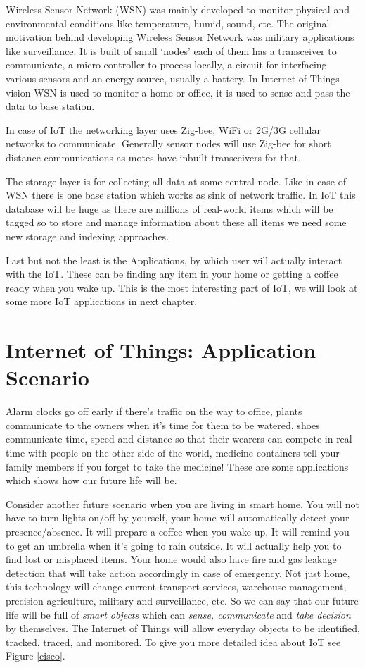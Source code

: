 \documentclass [a4paper,12pt]{book}
\begin{document}
Wireless Sensor Network (WSN) was mainly developed to monitor physical and environmental conditions like temperature, humid, sound, etc. The original motivation behind developing Wireless Sensor Network was military applications like surveillance. It is built of small `nodes' each of them has a transceiver to communicate, a micro controller to process locally, a circuit for interfacing various sensors and an energy source, usually a battery. In Internet of Things vision WSN is used to monitor a home or office, it is used to sense and pass the data to base station.

In case of IoT the networking layer uses Zig-bee, WiFi or 2G/3G cellular networks to communicate. Generally sensor nodes will use Zig-bee for short distance communications as motes have inbuilt transceivers for that.

The storage layer is for collecting all data at some central node. Like in case of WSN there is one base station which works as sink of network traffic. In IoT this database will be huge as there are millions of real-world items which will be tagged so to store and manage information about these all items we need some new storage and indexing approaches.

Last but not the least is the Applications, by which user will actually interact with the IoT. These can be finding any item in your home or getting a coffee ready when you wake up. This is the most interesting part of IoT, we will look at some more IoT applications in next chapter.

\section{Internet of Things: Application Scenario}

Alarm clocks go off early if there’s traffic on the way to office, plants communicate to the owners when it’s time for them to be watered, shoes communicate time, speed and distance so that their wearers can compete in real time with people on the other side of the world, medicine containers tell your family members if you forget to take the medicine! These are some applications which shows how our future life will be.

Consider another future scenario when you are living in smart home. You will not have to turn lights on/off by yourself, your home will automatically detect your presence/absence. It will prepare a coffee when you wake up, It will remind you to get an umbrella when it's going to rain outside. It will actually help you to find lost or misplaced items. Your home would also have fire and gas leakage detection that will take action accordingly in case of emergency. Not just home, this technology will change current transport services, warehouse management, precision agriculture, military and surveillance, etc. So we can say that our future life will be full of \emph{smart objects} which can \emph{sense, communicate} and \emph{take decision} by themselves. The Internet of Things will allow everyday objects to be identified, tracked, traced, and monitored. To give you more detailed idea about IoT see Figure \ref{cisco}.
\end{document}
